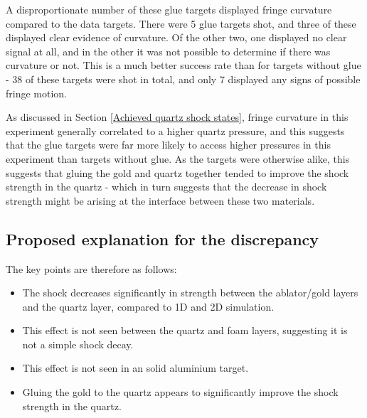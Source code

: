 A disproportionate number of these glue targets displayed fringe curvature compared to the data targets. There were 5 glue targets shot, and three of these displayed clear evidence of curvature. Of the other two, one displayed no clear signal at all, and in the other it was not possible to determine if there was curvature or not. This is a much better success rate than for targets without glue - 38 of these targets were shot in total, and only 7 displayed any signs of possible fringe motion. 

As discussed in Section \ref{Achieved quartz shock states}, fringe curvature in this experiment generally correlated to a higher quartz pressure, and this suggests that the glue targets were far more likely to access higher pressures in this experiment than targets without glue. As the targets were otherwise alike, this suggests that gluing the gold and quartz together tended to improve the shock strength in the quartz - which in turn suggests that the decrease in shock strength might be arising at the interface between these two materials.


\subsection{Proposed explanation for the discrepancy} \label{Curvature and Pressure}

The key points are therefore as follows:
\begin{itemize}
    \item The shock decreases significantly in strength between the ablator/gold layers and the quartz layer, compared to 1D and 2D simulation.
    \item This effect is not seen between the quartz and foam layers, suggesting it is not a simple shock decay.
    \item This effect is not seen in an solid aluminium target.
    \item Gluing the gold to the quartz appears to significantly improve the shock strength in the quartz.
\end{itemize}

